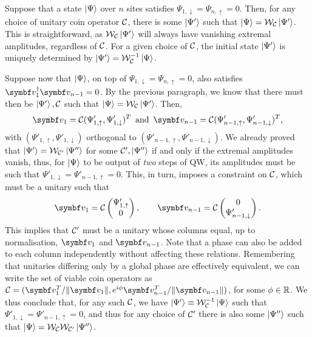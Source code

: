 Suppose that a state $\ket\Psi$ over $n$ sites satisfies $\Psi_{1,\downarrow}=\Psi_{n,\uparrow}=0$. Then, for any choice of unitary coin operator ${\mathcal{C}}$, there is some $\ket{\Psi'}$ such that $\ket\Psi={\mathcal{W}}_{\mathcal{C}}\ket{\Psi'}$.
This is straightforward, as ${\mathcal{W}}_{\mathcal{C}}\ket{\Psi'}$ will always have vanishing extremal amplitudes, regardless of ${\mathcal{C}}$. For a given choice of ${\mathcal{C}}$, the initial state $\ket{\Psi'}$ is uniquely determined by $\ket{\Psi'}={\mathcal{W}}_{\mathcal{C}}^{-1}\ket\Psi$.

Suppose now that $\ket\Psi$, on top of $\Psi_{1,\downarrow}=\Psi_{n,\uparrow}=0$, also satisfies $\bs v_1^\dagger \bs v_{n-1}=0$.
By the previous paragraph, we know that there must then be $\ket{\Psi'},{\mathcal{C}}$ such that $\ket\Psi={\mathcal{W}}_{\mathcal{C}}\ket{\Psi'}$. Then,
\begin{equation}
    \bs v_1=\calC(\Psi'_{1,\uparrow},\Psi'_{1,\downarrow})^T
    \,\text{ and }\,
    \bs v_{n-1}=\calC(\Psi'_{n-1,\uparrow},\Psi'_{n-1,\downarrow})^T,
\end{equation}
with $(\Psi'_{1,\uparrow},\Psi'_{1,\downarrow})$ orthogonal to
$(\Psi'_{n-1,\uparrow},\Psi'_{n-1,\downarrow})$.
We already proved that $\ket{\Psi'}={\mathcal{W}}_{{\mathcal{C}}'}\ket{\Psi''}$ for some ${\mathcal{C}}',\ket{\Psi''}$ if and only if the extremal amplitudes vanish, thus, for $\ket\Psi$ to be output of \emph{two} steps of QW, its amplitudes must be such that
$\Psi'_{1,\downarrow}=\Psi'_{n-1,\uparrow}=0$.
This, in turn, imposes a constraint on ${\mathcal{C}}$, which must be a unitary such that
\begin{equation}
    \bs v_1 = \calC \begin{pmatrix}
        \Psi'_{1,\uparrow} \\ 0
    \end{pmatrix}, \qquad
    \bs v_{n-1} = \calC \begin{pmatrix}
        0 \\ \Psi'_{n-1,\downarrow}
    \end{pmatrix}.
\end{equation}
This implies that ${\mathcal{C}}'$ must be a unitary whose columns equal, up to normalisation, $\bs v_1$ and $\bs v_{n-1}$. Note that a phase can also be added to each column independently without affecting these relations. Remembering that unitaries differing only by a global phase are effectively equivalent, we can write the set of viable coin operators as
$\calC = (\bs v_1^T/\|\bs v_1\|, e^{i\phi}\bs v_{n-1}^T/\|\bs v_{n-1}\|)$,
for some $\phi\in{\mathbb{R}}$.
We thus conclude that, for any such ${\mathcal{C}}$, we have $\ket{\Psi'}\equiv{\mathcal{W}}_{{\mathcal{C}}}^{-1}\ket\Psi$ such that $\Psi'_{1,\downarrow}=\Psi'_{n-1,\uparrow}=0$, and thus for any choice of ${\mathcal{C}}'$ there is also some $\ket{\Psi''}$ such that $\ket\Psi={\mathcal{W}}_{\mathcal{C}}{\mathcal{W}}_{{\mathcal{C}}'}\ket{\Psi''}$.


